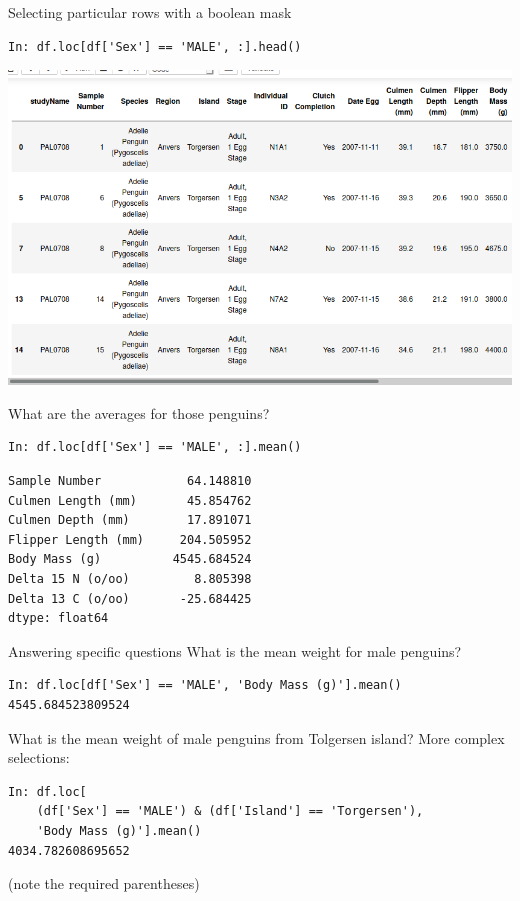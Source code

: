 \documentclass[aspectratio=169,usenames,dvipsnames]{beamer}
\begin{document}
\begin{frame}[fragile]{Selecting particular rows with a boolean mask}
\vspace{-0.5em}
\begin{lstlisting}
In: df.loc[df['Sex'] == 'MALE', :].head()
\end{lstlisting}

\vspace{-1em}
\includegraphics[height=0.8\textheight]{fig/penguinsmale}
\end{frame}

\begin{frame}[fragile]{What are the averages for those penguins?}
\vspace{-0.5em}
\begin{lstlisting}
In: df.loc[df['Sex'] == 'MALE', :].mean()
\end{lstlisting}\vspace{-1em}\begin{lstlisting}[style=plain]
Sample Number            64.148810
Culmen Length (mm)       45.854762
Culmen Depth (mm)        17.891071
Flipper Length (mm)     204.505952
Body Mass (g)          4545.684524
Delta 15 N (o/oo)         8.805398
Delta 13 C (o/oo)       -25.684425
dtype: float64
\end{lstlisting}
\end{frame}

\begin{frame}[fragile]{Answering specific questions}
What is the mean weight for male penguins?
\begin{lstlisting}
In: df.loc[df['Sex'] == 'MALE', 'Body Mass (g)'].mean()
4545.684523809524
\end{lstlisting}

\pause
What is the mean weight of male penguins from Tolgersen island?
More complex selections:
\begin{lstlisting}
In: df.loc[
	(df['Sex'] == 'MALE') & (df['Island'] == 'Torgersen'),
	'Body Mass (g)'].mean()
4034.782608695652
\end{lstlisting}
(note the required parentheses)
\end{frame}
\end{document}

